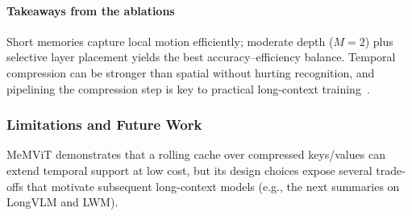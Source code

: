 \begin{enrichment}
\begin{enrichment}
        \paragraph{Takeaways from the ablations}
        Short memories capture local motion efficiently; moderate depth ($M{=}2$) plus selective layer placement yields the best accuracy–efficiency balance. Temporal compression can be stronger than spatial without hurting recognition, and pipelining the compression step is key to practical long-context training~\cite[Tables~1--3; Figs.~3--4]{wu2022_memvit}.
        
        \subsubsection{Limitations and Future Work}
        \label{subsubsec:chapter24_memvit_limits}
        
        MeMViT demonstrates that a rolling cache over compressed keys/values can extend temporal support at low cost, but its design choices expose several trade-offs that motivate subsequent long-context models (e.g., the next summaries on LongVLM and LWM).
        

\end{enrichment}
\end{enrichment}
